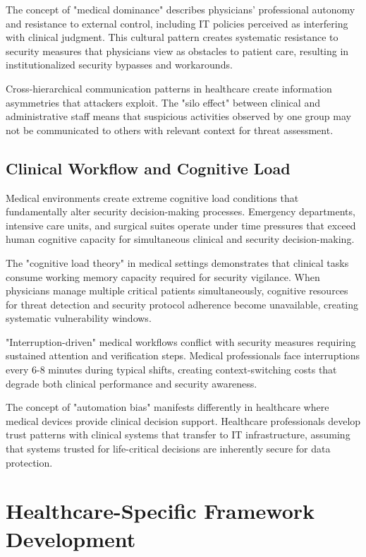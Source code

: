 \documentclass[10pt, twocolumn]{article}
\begin{document}
The concept of "medical dominance"\cite{freidson1970} describes physicians' professional autonomy and resistance to external control, including IT policies perceived as interfering with clinical judgment. This cultural pattern creates systematic resistance to security measures that physicians view as obstacles to patient care, resulting in institutionalized security bypasses and workarounds.

Cross-hierarchical communication patterns in healthcare create information asymmetries that attackers exploit. The "silo effect" between clinical and administrative staff means that suspicious activities observed by one group may not be communicated to others with relevant context for threat assessment\cite{baker2006}.

\subsection{Clinical Workflow and Cognitive Load}

Medical environments create extreme cognitive load conditions that fundamentally alter security decision-making processes. Emergency departments, intensive care units, and surgical suites operate under time pressures that exceed human cognitive capacity for simultaneous clinical and security decision-making.

The "cognitive load theory" in medical settings\cite{sweller2011} demonstrates that clinical tasks consume working memory capacity required for security vigilance. When physicians manage multiple critical patients simultaneously, cognitive resources for threat detection and security protocol adherence become unavailable, creating systematic vulnerability windows.

"Interruption-driven" medical workflows conflict with security measures requiring sustained attention and verification steps. Medical professionals face interruptions every 6-8 minutes during typical shifts\cite{westbrook2010}, creating context-switching costs that degrade both clinical performance and security awareness.

The concept of "automation bias" manifests differently in healthcare where medical devices provide clinical decision support. Healthcare professionals develop trust patterns with clinical systems that transfer to IT infrastructure, assuming that systems trusted for life-critical decisions are inherently secure for data protection\cite{goddard2012}.

\section{Healthcare-Specific Framework Development}
\end{document}
